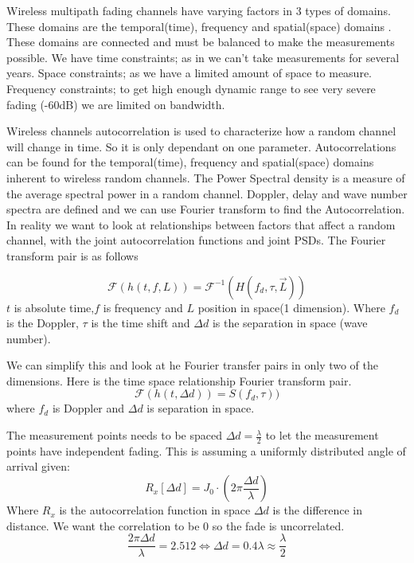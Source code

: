 Wireless multipath fading channels have varying factors in 3 types of domains. These domains are the temporal(time), frequency and spatial(space) domains \citep[p. 40-42]{stochasticWirelessChan}. These domains are connected and must be balanced to make the measurements possible. We have time constraints; as in we can't take measurements for several years. Space constraints; as we have a limited amount of space to measure. Frequency constraints; to get high enough dynamic range to see very severe fading (-60dB) we are limited on bandwidth.

Wireless channels autocorrelation is used to characterize how a random channel will change in time. So it is only dependant on one parameter. Autocorrelations can be found for the temporal(time), frequency and spatial(space) domains inherent to wireless random channels. The Power Spectral density is a measure of the average spectral power in a random channel. Doppler, delay and wave number spectra are defined and we can use Fourier transform to find the Autocorrelation. In reality we want to look at relationships between factors that affect a random channel, with the joint autocorrelation functions and joint PSDs\citep{SpaceWirelessChan}. The Fourier transform pair is as follows

\begin{equation}
\mathcal{F} ( h(t,f,L) ) =
\mathcal{F}^{-1} ( H(f_d,\tau,\vec{L}) )
\end{equation}
$t$ is absolute time,$f$ is frequency and $L$ position in space(1 dimension).
Where $f_d$ is the Doppler, $\tau$ is the time shift and $\Delta d$ is the separation in space (wave number).

We can simplify this and look at he Fourier transfer pairs in only two of the dimensions. Here is the time space relationship Fourier transform pair.
\begin{equation}
\mathcal{F} ( h(t,\Delta d) ) =
 S(f_d,\tau) )
\end{equation}
where $f_d$ is Doppler and $\Delta d$ is separation in space.

The measurement points needs to be spaced $\Delta d = \frac{\lambda}{2}$ to let the measurement points have independent fading. This is assuming a uniformly distributed angle of arrival given:
\begin{equation}
R_x[\Delta d] = J_0\cdot(2\pi \frac{\Delta d}{\lambda})
\end{equation}
Where $R_x$ is the autocorrelation function in space $\Delta d$ is the difference in distance.
We want the correlation to be 0 so the fade is uncorrelated.
\begin{equation}
\frac{2\pi \Delta d}{\lambda} = 2.512 \Leftrightarrow \Delta d = 0.4 \lambda \approx \frac{\lambda}{2}
\end{equation}

